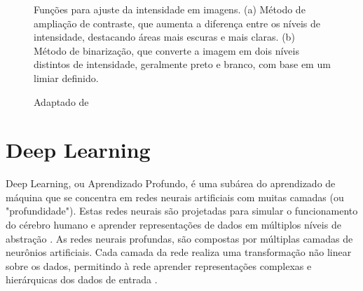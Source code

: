 \begin{figure}[H]
    \centering
    \caption{Funções para ajuste da intensidade em imagens. (a) Método de ampliação de contraste, que aumenta a diferença entre os níveis de intensidade, destacando áreas mais escuras e mais claras. (b) Método de binarização, que converte a imagem em dois níveis distintos de intensidade, geralmente preto e branco, com base em um limiar definido.}
    \quad %
    \caption*{Adaptado de }
    \end{figure}

\section{Deep Learning}

Deep Learning, ou Aprendizado Profundo, é uma subárea do aprendizado de máquina que se concentra em redes neurais artificiais com muitas camadas (ou "profundidade"). Estas redes neurais são projetadas para simular o funcionamento do cérebro humano e aprender representações de dados em múltiplos níveis de abstração \cite{goodfellow2016deep}.
As redes neurais profundas, são compostas por múltiplas camadas de neurônios artificiais. Cada camada da rede realiza uma transformação não linear sobre os dados, permitindo à rede aprender representações complexas e hierárquicas dos dados de entrada \cite{haykin2001redes}.

